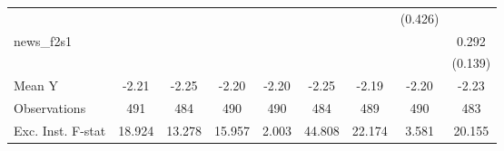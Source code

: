 {\begin{tabular}{l*{8}{c}}
            &                     &                     &                     &                     &                     &                     &     (0.426)         &                     \\
\addlinespace
news\_f2s1   &                     &                     &                     &                     &                     &                     &                     &       0.292\sym{**} \\
            &                     &                     &                     &                     &                     &                     &                     &     (0.139)         \\
\midrule
Mean Y      &       -2.21         &       -2.25         &       -2.20         &       -2.20         &       -2.25         &       -2.19         &       -2.20         &       -2.23         \\
Observations&         491         &         484         &         490         &         490         &         484         &         489         &         490         &         483         \\
Exc. Inst. F-stat&      18.924         &      13.278         &      15.957         &       2.003         &      44.808         &      22.174         &       3.581         &      20.155         \\
\bottomrule
\end{tabular}
}
